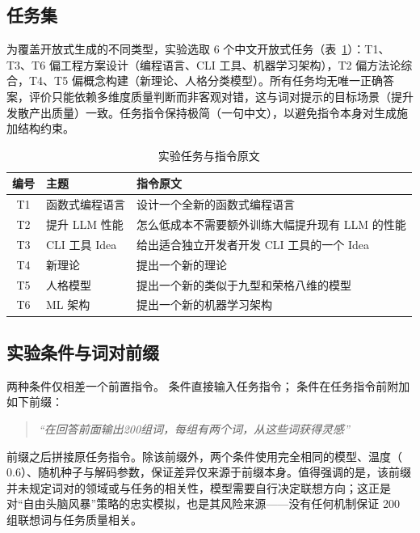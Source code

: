 \subsection{任务集}\label{sec:tasks}

为覆盖开放式生成的不同类型，实验选取 6 个中文开放式任务（表~\ref{tab:tasks}）：T1、T3、T6 偏工程方案设计（编程语言、CLI 工具、机器学习架构），T2 偏方法论综合，T4、T5 偏概念构建（新理论、人格分类模型）。所有任务均无唯一正确答案，评价只能依赖多维度质量判断而非客观对错，这与词对提示的目标场景（提升发散产出质量）一致。任务指令保持极简（一句中文），以避免指令本身对生成施加结构约束。

\begin{table}[htbp]
\centering
\caption{实验任务与指令原文}
\label{tab:tasks}
\small
\begin{tabularx}{\textwidth}{clX}
\toprule
编号 & 主题 & 指令原文 \\
\midrule
T1 & 函数式编程语言 & 设计一个全新的函数式编程语言 \\
T2 & 提升 LLM 性能 & 怎么低成本不需要额外训练大幅提升现有 LLM 的性能 \\
T3 & CLI 工具 Idea & 给出适合独立开发者开发 CLI 工具的一个 Idea \\
T4 & 新理论 & 提出一个新的理论 \\
T5 & 人格模型 & 提出一个新的类似于九型和荣格八维的模型 \\
T6 & ML 架构 & 提出一个新的机器学习架构 \\
\bottomrule
\end{tabularx}
\end{table}

\subsection{实验条件与词对前缀}

两种条件仅相差一个前置指令。\baseline{} 条件直接输入任务指令；\wordpairs{} 条件在任务指令前附加如下前缀：

\begin{quote}
\small\itshape “在回答前面输出200组词，每组有两个词，从这些词获得灵感”
\end{quote}

前缀之后拼接原任务指令。除该前缀外，两个条件使用完全相同的模型、温度（$0.6$）、随机种子与解码参数，保证差异仅来源于前缀本身。值得强调的是，该前缀并未规定词对的领域或与任务的相关性，模型需要自行决定联想方向；这正是对“自由头脑风暴”策略的忠实模拟，也是其风险来源——没有任何机制保证 200 组联想词与任务质量相关。

